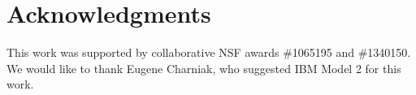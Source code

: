 \documentclass[conference]{IEEEtran}
\begin{document}




\section{Acknowledgments}
This work was supported by collaborative NSF awards \#1065195 and \#1340150.
We would like to thank Eugene Charniak,
who suggested IBM Model 2 for this work.


 

 
\end{document}
